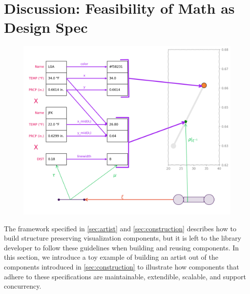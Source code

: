\documentclass[10pt,journal,compsoc]{IEEEtran}
\theoremstyle{definition}
\theoremstyle{remark}
\begin{document}
\section{Discussion: Feasibility of Math as Design Spec}
\label{sec:discussion}
\begin{figure}
  \includegraphics[width=1\columnwidth]{full_line.png}
  \caption{\label{fig:construction:artist:combo}}
\end{figure}
The framework specified in \autoref{sec:artist} and \autoref{sec:construction} describes how to build structure preserving visualization components, but it is left to the library developer to follow these guidelines when building and reusing components. In this section, we introduce a toy example of building an artist out of the components introduced in \autoref{sec:construction} to illustrate how components that adhere to these specifications are maintainable, extendible, scalable, and support concurrency. 

\begin{figure}[h!]
  \centering
  \label{fig:discussion:bar}
\end{figure}
\end{document}
